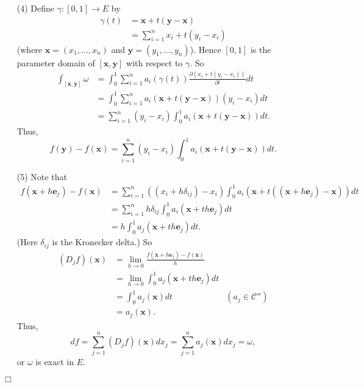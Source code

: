 \documentclass{article}
\begin{document}
\begin{enumerate}
\item[(4)]
  Define $\gamma: [0,1] \to E$ by
  \begin{align*}
    \gamma(t)
    &= \mathbf{x} + t(\mathbf{y}-\mathbf{x}) \\
    &= \sum_{i=1}^{n} x_i + t(y_i - x_i)
  \end{align*}
  (where $\mathbf{x} = (x_1, \ldots, x_n)$ and $\mathbf{y} = (y_1, \ldots, y_n)$).
  Hence $[0,1]$ is the parameter domain of $[\mathbf{x},\mathbf{y}]$ with respect to $\gamma$.
  So
  \begin{align*}
    \int_{[\mathbf{x},\mathbf{y}]} \omega
    &= \int_{0}^{1} \sum_{i=1}^{n} a_i(\gamma(t))
      \frac{\partial (x_i + t(y_i - x_i))}{\partial t} dt \\
    &= \int_{0}^{1} \sum_{i=1}^{n} a_i(\mathbf{x} + t(\mathbf{y}-\mathbf{x}))(y_i - x_i) dt \\
    &= \sum_{i=1}^{n} (y_i - x_i) \int_{0}^{1} a_i(\mathbf{x} + t(\mathbf{y}-\mathbf{x})) dt.
  \end{align*}
  Thus,
  \[
    f(\mathbf{y}) - f(\mathbf{x})
    = \sum_{i=1}^{n} (y_i - x_i) \int_{0}^{1} a_i(\mathbf{x} + t(\mathbf{y}-\mathbf{x})) dt.
  \]

\item[(5)]
  Note that
  \begin{align*}
    f(\mathbf{x} + h \mathbf{e}_j) - f(\mathbf{x})
    &= \sum_{i=1}^{n} ((x_i + h\delta_{ij}) - x_i)
      \int_{0}^{1} a_i(\mathbf{x} + t((\mathbf{x} + h \mathbf{e}_j)-\mathbf{x})) dt \\
    &= \sum_{i=1}^{n} h\delta_{ij}
      \int_{0}^{1} a_i(\mathbf{x} + th \mathbf{e}_j) dt \\
    &= h \int_{0}^{1} a_j(\mathbf{x} + th \mathbf{e}_j) dt.
  \end{align*}
  (Here $\delta_{ij}$ is the Kronecker delta.)
  So
  \begin{align*}
    (D_j f)(\mathbf{x})
    &= \lim_{h \to 0}
      \frac{f(\mathbf{x} + h \mathbf{e}_j) - f(\mathbf{x})}{h} \\
    &= \lim_{h \to 0}
      \int_{0}^{1} a_j(\mathbf{x} + th \mathbf{e}_j) dt \\
    &= \int_{0}^{1} a_j(\mathbf{x}) dt
      &(a_j \in \mathscr{C}'') \\
    &= a_j(\mathbf{x}).
  \end{align*}
  Thus,
  \[
    df
    = \sum_{j=1}^{n} (D_j f)(\mathbf{x}) dx_j
    = \sum_{j=1}^{n} a_j(\mathbf{x}) dx_j
    = \omega,
  \]
  or $\omega$ is exact in $E$.
\end{enumerate}
$\Box$ \\\\
\end{document}
